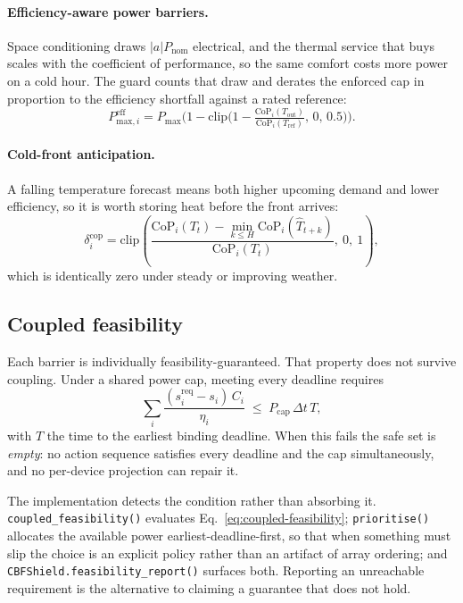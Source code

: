 \documentclass[11pt]{article}
\begin{document}
\paragraph{Efficiency-aware power barriers.} Space conditioning draws
$|a| P_{\text{nom}}$ electrical, and the thermal service that buys scales with
the coefficient of performance, so the same comfort costs more power on a cold
hour. The guard counts that draw and derates the enforced cap in proportion to
the efficiency shortfall against a rated reference:
\begin{equation}
P^{\text{eff}}_{\text{max},i} = P_{\text{max}}\Big(1 - \mathrm{clip}\big(1 - \tfrac{\text{CoP}_i(T_{\text{out}})}{\text{CoP}_i(T_{\text{ref}})},\,0,\,0.5\big)\Big).
\label{eq:cop-derate}
\end{equation}

\paragraph{Cold-front anticipation.} A falling temperature forecast means both
higher upcoming demand and lower efficiency, so it is worth storing heat before
the front arrives:
\begin{equation}
\delta^{\text{cop}}_i = \mathrm{clip}\!\left(\frac{\text{CoP}_i(T_t) - \min_{k \le H}\text{CoP}_i(\hat T_{t+k})}{\text{CoP}_i(T_t)},\ 0,\ 1\right),
\label{eq:cop-drop}
\end{equation}
which is identically zero under steady or improving weather.

\subsection{Coupled feasibility}
\label{sec:coupled}

Each barrier is individually feasibility-guaranteed. That property does not
survive coupling. Under a shared power cap, meeting every deadline requires
\begin{equation}
\sum_i \frac{(s^{\text{req}}_i - s_i)\,C_i}{\eta_i} \;\le\; P_{\text{cap}}\, \Delta t\, T,
\label{eq:coupled-feasibility}
\end{equation}
with $T$ the time to the earliest binding deadline. When this fails the safe set
is \emph{empty}: no action sequence satisfies every deadline and the cap
simultaneously, and no per-device projection can repair it.

The implementation detects the condition rather than absorbing it.
\texttt{coupled\_feasibility()} evaluates Eq.~\ref{eq:coupled-feasibility};
\texttt{prioritise()} allocates the available power earliest-deadline-first, so
that when something must slip the choice is an explicit policy rather than an
artifact of array ordering; and \texttt{CBFShield.feasibility\_report()} surfaces
both. Reporting an unreachable requirement is the alternative to claiming a
guarantee that does not hold.
\end{document}
